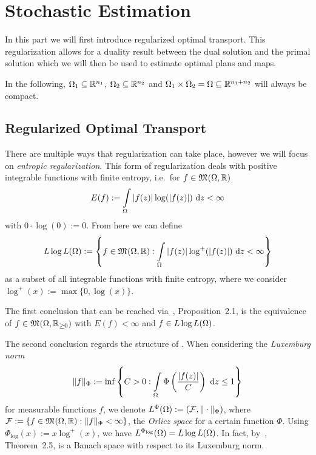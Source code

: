 \chapter{Stochastic Estimation}\label{DualPlanEst}

In this part we will first introduce regularized optimal transport. This regularization allows for a duality result between the dual solution and the primal solution which we will then be used to estimate optimal plans and maps.

In the following, $\Omega_1 \subseteq \R^{n_1}$, $\Omega_2 \subseteq \R^{n_2}$ and $\Omega_1 \times \Omega_2 = \Omega \subseteq \R^{n_1 + n_2}$ will always be compact.


\section{Regularized Optimal Transport}\label{RegOT}

There are multiple ways that regularization can take place, however we will focus on \textit{entropic regularization}. This form of regularization deals with positive integrable functions with finite entropy, i.e.~for $f \in \MF{\Omega}{\R}$
\[ E(f) := \int\limits_\Omega \vert f(z) \vert \log(\vert f(z) \vert)~\D[z] < \infty \]
with $0 \cdot \log(0) := 0$. From here we can define
\[ \LLL := \left\{ f \in \MF{\Omega}{\R} : \int\limits_\Omega \vert f(z) \vert \log^+(\vert f(z) \vert)~\D[z] < \infty \right\} \]
as a subset of all integrable functions with finite entropy, where we consider $\log^+(x) := \max \{ 0, \log (x) \}$.

The first conclusion that can be reached via~\cite{Cla2021}, Proposition~2.1, is the equivalence of $f \in \MF{\Omega}{\RZero}$ with $E(f) < \infty$ and $f \in \LLL$.

The second conclusion regards the structure of \LLL{}. When considering the \textit{Luxemburg norm}
\[ \Vert f \Vert_\Phi := \inf \left\{ C > 0 : \int\limits_\Omega \Phi\left( \frac{\vert f(z) \vert}{C} \right)~\D[z] \le 1 \right\} \]
for measurable functions $f$, we denote $\Orlicz{\Phi} := (\mathcal{F}, \Vert \cdot \Vert_\Phi)$, where $\mathcal{F} := \{ f \in \MF{\Omega}{\R} : \Vert f \Vert_\Phi < \infty \}$, the \textit{Orlicz space} for a certain function $\Phi$. Using $\Phi_{\log}(x) := x \log^+ (x)$, we have $\Orlicz{\Phi_{\log}} = \LLL$. In fact, by~\cite{Cla2021}, Theorem~2.5, \LLL{} is a Banach space with respect to its Luxemburg norm.

